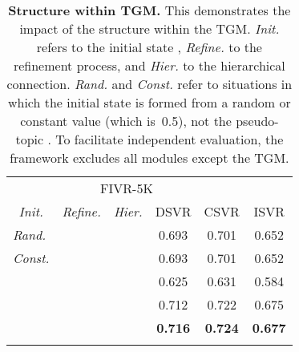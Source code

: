 \documentclass[10pt,twocolumn,letterpaper]{article}
\newcommand{\cmark}{\ding{51}}
\begin{document}
    \begin{table}[!t]
    \footnotesize
    \centering
    \begin{tabular}{ccc|ccc}
        \cmidrule[\heavyrulewidth]{1-6}
        \morecmidrules
        \cmidrule[\heavyrulewidth]{1-6} 
        \multicolumn{3}{c|}{TGM}                        & \multicolumn{3}{c}{FIVR-5K} \\ \cmidrule(){1-6}
        \textit{Init.} & \textit{Refine.} & \textit{Hier.} & DSVR    & CSVR    & ISVR    \\ \midrule
        \multicolumn{1}{l}{\textit{Rand.}}       & \cmark               & \cmark   & 0.693   & 0.701   & 0.652   \\
        \multicolumn{1}{l}{\textit{Const.}}      & \cmark               & \cmark   & 0.693   & 0.701   & 0.652   \\ \midrule
        \multicolumn{1}{l}{}                  &                      &          & 0.625   & 0.631   & 0.584   \\
        \multicolumn{1}{l}{}                  & \cmark               &          & 0.712   & 0.722   & 0.675   \\
        \multicolumn{1}{l}{}                  & \cmark               & \cmark   & \textbf{0.716} & \textbf{0.724} & \textbf{0.677}   \\
        \cmidrule[\heavyrulewidth]{1-6}
        \morecmidrules
        \cmidrule[\heavyrulewidth]{1-6} 
    \end{tabular}
    \vspace{-4mm}
    \caption{\textbf{Structure within TGM.} This demonstrates the impact of the structure within the TGM. \textit{Init.} refers to the initial state , \textit{Refine.} to the refinement process, and \textit{Hier.} to the hierarchical connection. \textit{Rand.} and \textit{Const.} refer to situations in which the initial state is formed from a random or constant value (which is~0.5), not the pseudo-topic . To facilitate independent evaluation, the framework excludes all modules except the TGM. \vspace{-4mm}}
    \label{tab:compo_ablation_tgm}
    \end{table}
        \vspace{-0mm}
        
\end{document}

